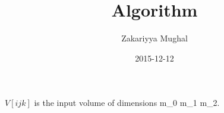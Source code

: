 \documentclass[12pt]{article}
\title{Algorithm}
\author{Zakariyya Mughal}
\date{2015-12-12}
\newcommand{\InputVolume}{$V[ijk]$}
\newcommand{\InputVolumeDimensions}{m_0 \times m_1 \times m_2}
\begin{document}
\InputVolume{} is the input volume of dimensions
\InputVolumeDimensions{}.
\end{document}

